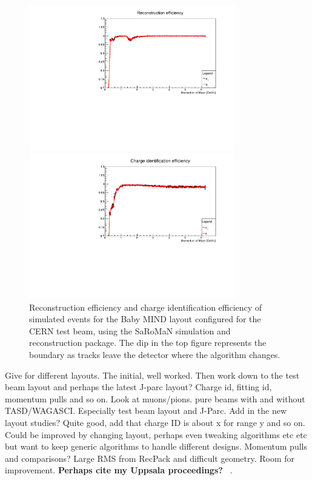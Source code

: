 \begin{figure}[h!]
\centering
\includegraphics[width=0.8\textwidth]{figures/oldStudies/FullFitted.pdf}

\includegraphics[width=0.8\textwidth]{figures/oldStudies/FullChargeID.pdf}
\caption{Reconstruction efficiency and charge identification efficiency of simulated events for the Baby MIND layout configured for the CERN test beam, using the SaRoMaN simulation and reconstruction package. The dip in the top figure represents the boundary as tracks leave the detector where the algorithm changes.}
\label{fig:TestBeamMIND2}
\end{figure}

Give for different layouts. The initial, well worked. Then work down to the test beam layout and perhaps the latest J-parc layout? 
Charge id, fitting id, momentum pulls and so on.
Look at muons/pions. pure beams with and without TASD/WAGASCI. Especially test beam layout and J-Parc.
Add in the new layout studies?
Quite good, add that charge ID is about x for range y and so on.  Could be improved by changing layout, perhaps even tweaking algorithms etc etc but want to keep generic algorithms to handle different designs.
Momentum pulls and comparisons? Large RMS from RecPack and difficult geometry. Room for improvement.
\textbf{Perhaps cite my Uppsala proceedings?} ~\cite{82Uppsala}.
\fi

